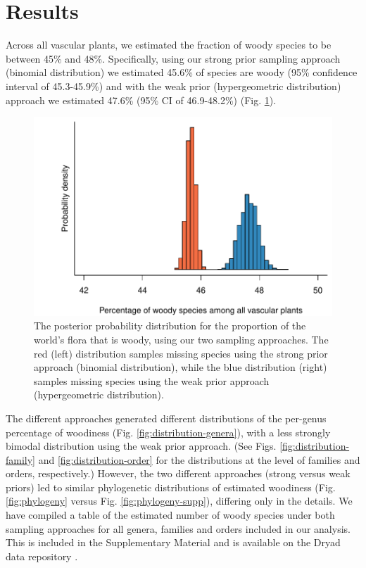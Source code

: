 \section{Results}

Across all vascular plants, we estimated the fraction of woody species
to be between 45\% and 48\%.
Specifically, using our strong prior sampling approach (binomial
distribution) we estimated 45.6\% of species are woody (95\%
confidence interval of 45.3-45.9\%) and with the weak prior
(hypergeometric distribution) approach we estimated 47.6\% (95\% CI of
46.9-48.2\%) (Fig. \ref{fig:distribution-raw}).
%

\begin{figure}[p]
  \centering
  \includegraphics[width=\textwidth]{figs/distribution-raw}
  \caption[Estimates of woodiness proportion using both
  approaches]{The posterior probability distribution for
    the proportion of the world's flora that is woody, using our two
    sampling approaches.  The red (left) distribution samples missing
    species using the strong prior approach (binomial distribution),
    while the blue distribution (right) samples missing species using
    the weak prior approach (hypergeometric distribution).}
  \label{fig:distribution-raw}
\end{figure}


The different approaches generated different distributions of the
per-genus percentage of woodiness (Fig.
\ref{fig:distribution-genera}), with a less strongly bimodal
distribution using the weak prior approach. (See Figs.
\ref{fig:distribution-family} and \ref{fig:distribution-order} 
for the distributions at the level of families and orders, respectively.) 
However, the two different approaches (strong
versus weak priors) led to similar phylogenetic distributions of
estimated woodiness (Fig. \ref{fig:phylogeny} versus Fig.
\ref{fig:phylogeny-supp}), differing only in the details. We have compiled
a table of the estimated number of woody species under both sampling
approaches for all genera, families and orders included in our analysis.
This is included in the Supplementary Material and is available on the 
Dryad data repository \citep[doi:10.5061/dryad.v7m14]{FitzJohnDryad}.

